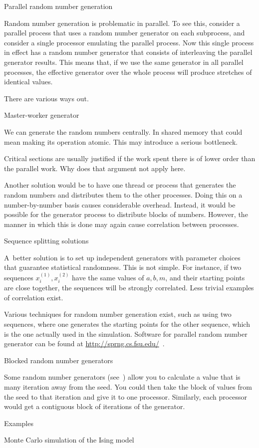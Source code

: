  {Parallel random number generation}

Random number generation is problematic in parallel. To see this,
consider a parallel process that uses a random number generator on
each subprocess, and
consider a single processor emulating the parallel process. Now this
single process in effect has a random number generator that consists
of interleaving the parallel generator results. This means that, if we
use the same generator in all parallel processes, the effective
generator over the whole process will produce stretches of identical
values.

There are various ways out.

 {Master-worker generator}

We can generate the random numbers centrally. In shared memory that could mean
making its operation atomic. This may introduce a serious bottleneck.
\begin{exercise}
  Critical sections are usually justified if the work spent there is of lower order
  than the parallel work. Why does that argument not apply here.
\end{exercise}

Another solution would be to have one thread or process that generates
the random numbers and distributes them to the other processes.
Doing this on a number-by-number basis causes considerable overhead.
Instead, it would be possible for the generator process to distribute
blocks of numbers. However, the manner in which this is done may again
cause correlation between processes.

 {Sequence splitting solutions}

A~better solution is to set up independent generators with
parameter choices that guarantee statistical randomness. This is not
simple. For instance, if two sequences $x^{(1)}_i,x^{(2)}_i$ have the
same values of $a,b,m$, and their starting points are close together,
the sequences will be strongly correlated. Less trivial examples of
correlation exist.

Various techniques for random number generation exist, such as using
two sequences, where one generates the starting points for the other
sequence, which is the one actually used in the simulation. Software
for parallel random number generator can be found at
\url{http://sprng.cs.fsu.edu/}~\cite{Mascagni:SPRNG}.

 {Blocked random number generators}

Some random number generators (see~\cite{LEcuyer:multiple-random})
allow you to calculate a value that is many iteration away from the seed.
You could then take the block of values from the seed to that iteration
and give it to one processor. Similarly, each processor would get a contiguous
block of iterations of the generator.


 {Examples}

 {Monte Carlo simulation of the Ising model}
\label{sec:ising}


